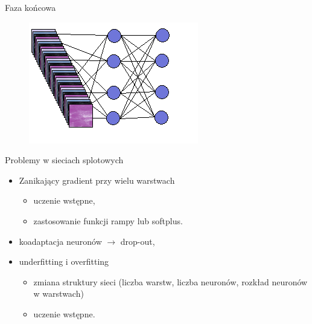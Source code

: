 \documentclass[xcolor=dvipsnames]{beamer}
\begin{document}
\begin{frame}{Faza końcowa}
	\begin{figure}
		\includegraphics[width=\linewidth, height=0.7\textheight, keepaspectratio] {img/fully_connected_layer.png}
	\end{figure}
\end{frame}

\begin{frame}{Problemy w sieciach splotowych}
	\begin{itemize}
		\item Zanikający gradient przy wielu warstwach
		\begin{itemize}
			\item uczenie wstępne,
			\item zastosowanie funkcji rampy lub softplus.
		\end{itemize}
		\item koadaptacja neuronów $\rightarrow$ drop-out,
		\item underfitting i overfitting
		\begin{itemize}
			\item zmiana struktury sieci (liczba warstw, liczba neuronów, rozkład neuronów w warstwach)
			\item uczenie wstępne.
		\end{itemize}
	\end{itemize}
\end{frame}
\end{document}
